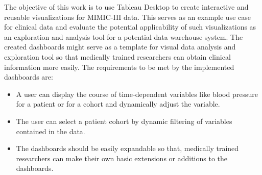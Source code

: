 The objective of this work is to use Tableau Desktop to create interactive and reusable visualizations for MIMIC-III data. This serves as an example use case for clinical data and evaluate the potential applicability of such visualizations as an exploration and analysis tool for a potential data warehouse system.
The created dashboards might serve as a template for visual data analysis and exploration tool so that medically trained researchers can obtain clinical information more easily.
The requirements to be met by the implemented dashboards are:
\begin{itemize}
\item A user can display the course of time-dependent variables like blood pressure for a patient or for a cohort and dynamically adjust the variable.
\item The user can select a patient cohort by dynamic filtering of variables contained in the data.
\item The dashboards should be easily expandable so that, medically trained researchers can make their own basic extensions or additions to the dashboards.
\end{itemize}